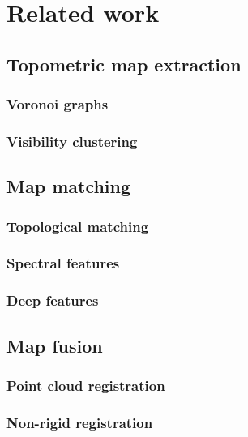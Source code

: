 \section{Related work}

\subsection{Topometric map extraction}
\subsubsection{Voronoi graphs}
\subsubsection{Visibility clustering}

\subsection{Map matching}
\subsubsection{Topological matching}
\subsubsection{Spectral features}
\subsubsection{Deep features}

\subsection{Map fusion}
\subsubsection{Point cloud registration}
\subsubsection{Non-rigid registration}